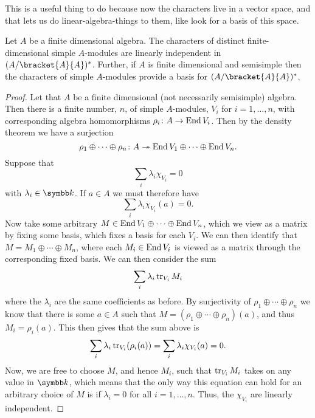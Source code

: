 This is a useful thing to do because now the characters live in a vector space, and that lets us do linear-algebra-things to them, like look for a basis of this space.

\begin{thm}{}{}
    Let \(A\) be a finite dimensional algebra.
    The characters of distinct finite-dimensional simple \(A\)-modules are linearly independent in \((A/\bracket{A}{A})^*\).
    Further, if \(A\) is finite dimensional and semisimple then the characters of simple \(A\)-modules provide a basis for \((A/\bracket{A}{A})^*\).
    \begin{proof}
        Let that \(A\) be a finite dimensional (not necessarily semisimple) algebra.
        Then there is a finite number, \(n\), of simple \(A\)-modules, \(V_i\) for \(i = 1, \dotsc, n\), with corresponding algebra homomorphisms \(\rho_i \colon A \to \operatorname{End} V_i\).
        Then by the density theorem we have a surjection
        \begin{equation}
            \rho_1 \oplus \dotsb \oplus \rho_n \colon A \twoheadrightarrow \operatorname{End} V_1 \oplus \dotsb \oplus \operatorname{End} V_n.
        \end{equation}
        Suppose that
        \begin{equation}
            \sum_i \lambda_i \chi_{V_i} = 0
        \end{equation}
        with \(\lambda_i \in \field\).
        If \(a \in A\) we must therefore have
        \begin{equation}
            \sum_i \lambda_i \chi_{V_i}(a) = 0.
        \end{equation}
        Now take some arbitrary \(M \in \operatorname{End} V_1 \oplus \dotsb \oplus \operatorname{End} V_n\), which we view as a matrix by fixing some basis, which fixes a basis for each \(V_i\).
        We can then identify that \(M = M_1 \oplus \dotsb \oplus M_n\), where each \(M_i \in \operatorname{End} V_i\) is viewed as a matrix through the corresponding fixed basis.
        We can then consider the sum
        \begin{equation}
            \sum_i \lambda_i \operatorname{tr}_{V_i} M_i
        \end{equation}
        where the \(\lambda_i\) are the same coefficients as before.
        By surjectivity of \(\rho_1 \oplus \dotsb \oplus \rho_n\) we know that there is some \(a \in A\) such that \(M = (\rho_1 \oplus \dotsb \oplus \rho_n)(a)\), and thus \(M_i = \rho_i(a)\).
        This then gives that the sum above is
        \begin{equation}
            \sum_i \lambda_i \operatorname{tr}_{V_i}(\rho_i(a)) = \sum_i \lambda_i \chi_{V_i}(a) = 0.
        \end{equation}
        Now, we are free to choose \(M\), and hence \(M_i\), such that \(\operatorname{tr}_{V_i} M_i\) takes on any value in \(\field\), which means that the only way this equation can hold for an arbitrary choice of \(M\) is if \(\lambda_i = 0\) for all \(i = 1, \dotsc, n\).
        Thus, the \(\chi_{V_i}\) are linearly independent.
        

\end{proof}
\end{thm}
